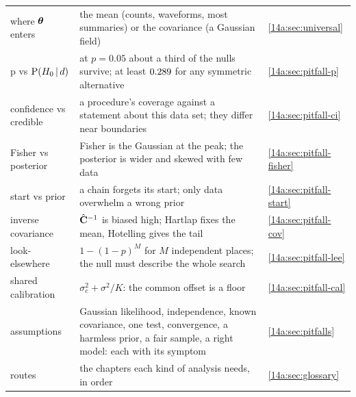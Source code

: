 \begin{center}
\begin{tabularx}{\linewidth}{@{}>{\raggedright\arraybackslash}p{3.3cm}
                               >{\raggedright\arraybackslash}X
                               >{\raggedright\arraybackslash}p{2.3cm}@{}}
where $\bm{\theta}$ enters & the mean (counts, waveforms, most summaries) or the covariance (a Gaussian field) & \cref{14a:sec:universal}\\
p vs $\operatorname{P}(H_0\,\vert\, d)$ & at $p=0.05$ about a third of the nulls survive; at least $0.289$ for any symmetric alternative & \cref{14a:sec:pitfall-p}\\
confidence vs credible & a procedure's coverage against a statement about this data set; they differ near boundaries & \cref{14a:sec:pitfall-ci}\\
Fisher vs posterior & Fisher is the Gaussian at the peak; the posterior is wider and skewed with few data & \cref{14a:sec:pitfall-fisher}\\
start vs prior & a chain forgets its start; only data overwhelm a wrong prior & \cref{14a:sec:pitfall-start}\\
inverse covariance & $\hat{\mathbf{C}}^{-1}$ is biased high; Hartlap fixes the mean, Hotelling gives the tail & \cref{14a:sec:pitfall-cov}\\
look-elsewhere & $1-(1-p)^M$ for $M$ independent places; the null must describe the whole search & \cref{14a:sec:pitfall-lee}\\
shared calibration & $\sigma_c^2+\sigma^2/K$: the common offset is a floor & \cref{14a:sec:pitfall-cal}\\
assumptions & Gaussian likelihood, independence, known covariance, one test, convergence, a harmless prior, a fair sample, a right model: each with its symptom & \cref{14a:sec:pitfalls}\\
routes & the chapters each kind of analysis needs, in order & \cref{14a:sec:glossary}\\
\bottomrule
\end{tabularx}
\end{center}
  